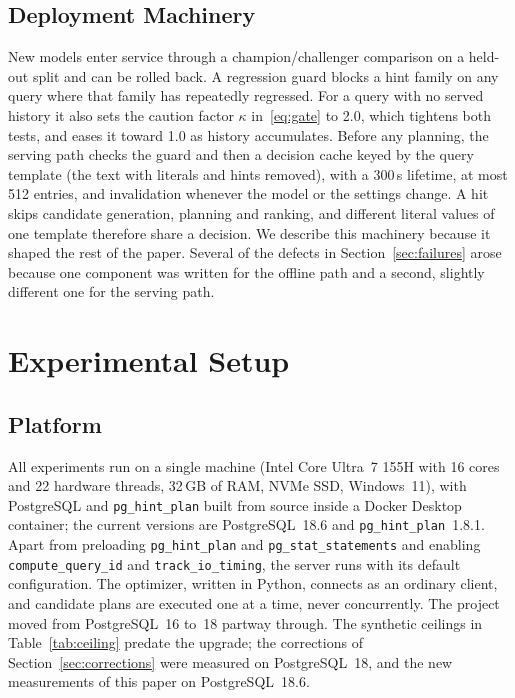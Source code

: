 \documentclass[conference]{IEEEtran}
\begin{document}
\subsection{Deployment Machinery}

New models enter service through a champion/challenger comparison on a
held-out split and can be rolled back. A regression guard blocks a hint family on any query where that
family has repeatedly regressed. For a query with no served history it also
sets the caution factor $\kappa$ in~\eqref{eq:gate} to 2.0, which tightens both
tests, and eases it toward 1.0 as history accumulates. Before any planning, the
serving path checks the guard and then a decision cache keyed by the query
template (the text with literals and hints removed), with a 300\,s lifetime, at
most 512 entries, and invalidation whenever the model or the settings change. A
hit skips candidate generation, planning and ranking, and different literal
values of one template therefore share a decision. We describe
this machinery because it shaped the rest of the paper. Several of the defects
in Section~\ref{sec:failures} arose because one component was written for the
offline path and a second, slightly different one for the serving path.

\section{Experimental Setup}
\label{sec:setup}

\subsection{Platform}

All experiments run on a single machine (Intel Core Ultra~7 155H with 16 cores
and 22 hardware threads, 32\,GB of RAM, NVMe SSD, Windows~11), with
PostgreSQL and \texttt{pg\_hint\_plan} built from source inside a Docker
Desktop container; the current versions are PostgreSQL~18.6 and
\texttt{pg\_hint\_plan}~1.8.1. Apart from preloading \texttt{pg\_hint\_plan}
and \texttt{pg\_stat\_statements} and enabling \texttt{compute\_query\_id} and
\texttt{track\_io\_timing}, the server runs with its default configuration. The optimizer, written in
Python, connects as an ordinary client, and candidate plans are executed one
at a time, never concurrently. The project moved from PostgreSQL~16 to~18
partway through. The synthetic ceilings in Table~\ref{tab:ceiling} predate the
upgrade; the corrections of Section~\ref{sec:corrections} were measured on
PostgreSQL~18, and the new measurements of this paper on PostgreSQL~18.6.
\end{document}
